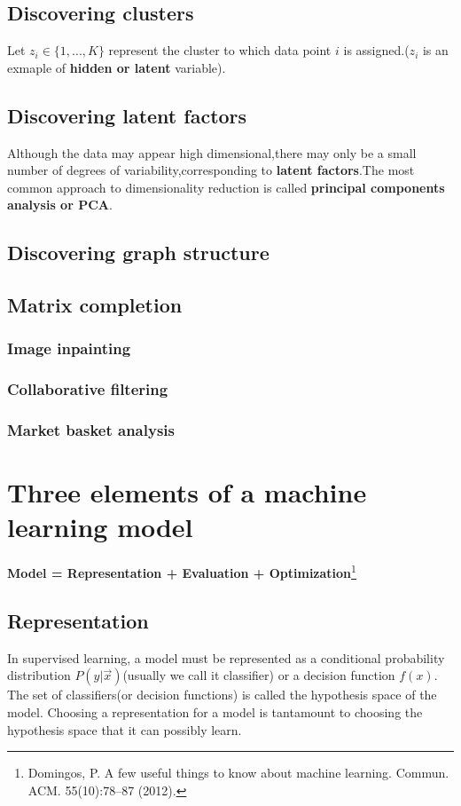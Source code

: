 \subsection{Discovering clusters}
Let $z_i \in \{1,...,K\}$ represent the cluster to which data point $i$ is assigned.($z_i$ is an exmaple of \textbf{hidden or latent} variable).
\subsection{Discovering latent factors}
Although the data may appear high dimensional,there may only be a small number of degrees of variability,corresponding to \textbf{latent factors}.The most common approach to dimensionality reduction is called \textbf{principal components analysis or PCA}.
\subsection{Discovering graph structure}
\subsection{Matrix completion}
\subsubsection{Image inpainting}
\subsubsection{Collaborative filtering}
\subsubsection{Market basket analysis}

\section{Three elements of a machine learning model}

\textbf{Model = Representation + Evaluation + Optimization}\footnote{Domingos, P. A few useful things to know about machine learning. Commun. ACM. 55(10):78–87 (2012).}


\subsection{Representation}
In supervised learning, a model must be represented as a conditional probability distribution $P(y|\vec{x})$(usually we call it classifier) or a decision function $f(x)$. The set of classifiers(or decision functions) is called the hypothesis space of the model. Choosing a representation for a model is tantamount to choosing the hypothesis space that it can possibly learn. 


